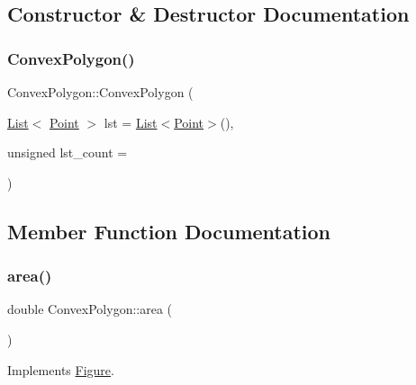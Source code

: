 \subsection{Constructor \& Destructor Documentation}
\mbox{\label{class_convex_polygon_aac5d610baed71675c395b4ef0898dfd2}} 
\subsubsection{\texorpdfstring{Convex\+Polygon()}{ConvexPolygon()}}
{\footnotesize\ttfamily Convex\+Polygon\+::\+Convex\+Polygon (\begin{DoxyParamCaption}\item[{\hyperlink{class_list}{List}$<$ \hyperlink{class_point}{Point} $>$}]{lst = {\ttfamily \hyperlink{class_list}{List}$<$\hyperlink{class_point}{Point}$>$()},  }\item[{unsigned}]{lst\+\_\+count = {} }\end{DoxyParamCaption})}



\subsection{Member Function Documentation}
\mbox{\label{class_convex_polygon_a4d8ca9c4d454308dcd95ae9f9dee2688}} 
\subsubsection{\texorpdfstring{area()}{area()}}
{\footnotesize\ttfamily double Convex\+Polygon\+::area (\begin{DoxyParamCaption}{ }\end{DoxyParamCaption})\hspace{0.3cm}{\ttfamily [virtual]}}



Implements \hyperlink{class_figure_a9860bda67fc9ce8127a812e167c4ce75}{Figure}.

\mbox{\label{class_convex_polygon_a6956c62f285204cec995cd0c3e7ed852}} 
